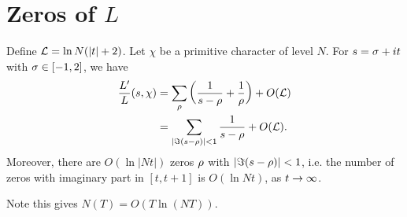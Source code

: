 \section{Zeros of $L$}
\begin{lem}
Define $\cal L=\ln N(|t|+2)$. Let $\chi$ be a primitive character of level $N$. 
For $s=\si+it$ with $\si\in [-1,2]$, %
we have
\begin{align*}
\frac{L'}{L}(s,\chi)&=\sum_{\rh}\pa{\rc{s-\rh}+\rc{\rh}}+O(\cal L)\\
&=\sum_{|\Im(s-\rh)|<1} \rc{s-\rh} +O(\cal L).
\end{align*}
Moreover, there are $O(\ln|Nt|)$ zeros $\rh$ with $|\Im(s-\rh)|<1$, i.e. the number of zeros with imaginary part in $[t,t+1]$ is $O(\ln Nt)$, as $t\to \iy$.
\end{lem}
Note this gives $N(T)=O(T\ln(NT))$.

